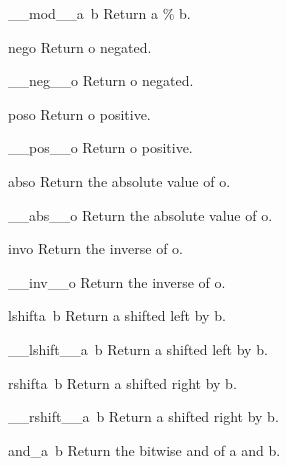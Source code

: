 \begin{funcdesc}{\_\_mod\_\_}{a\, b}
Return a \% b.
\end{funcdesc}

\begin{funcdesc}{neg}{o}
Return o negated.
\end{funcdesc}

\begin{funcdesc}{\_\_neg\_\_}{o}
Return o negated.
\end{funcdesc}

\begin{funcdesc}{pos}{o}
Return o positive.
\end{funcdesc}

\begin{funcdesc}{\_\_pos\_\_}{o}
Return o positive.
\end{funcdesc}

\begin{funcdesc}{abs}{o}
Return the absolute value of o.
\end{funcdesc}

\begin{funcdesc}{\_\_abs\_\_}{o}
Return the absolute value of o.
\end{funcdesc}

\begin{funcdesc}{inv}{o}
Return the inverse of o.
\end{funcdesc}

\begin{funcdesc}{\_\_inv\_\_}{o}
Return the inverse of o.
\end{funcdesc}

\begin{funcdesc}{lshift}{a\, b}
Return a shifted left by b.
\end{funcdesc}

\begin{funcdesc}{\_\_lshift\_\_}{a\, b}
Return a shifted left by b.
\end{funcdesc}

\begin{funcdesc}{rshift}{a\, b}
Return a shifted right by b.
\end{funcdesc}

\begin{funcdesc}{\_\_rshift\_\_}{a\, b}
Return a shifted right by b.
\end{funcdesc}

\begin{funcdesc}{and\_}{a\, b}
Return the bitwise and of a and b.
\end{funcdesc}

